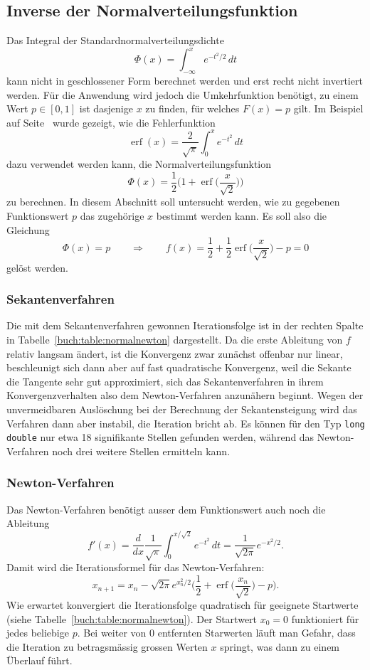 %
%
%
\subsection{Inverse der Normalverteilungsfunktion
\label{buch:subsection:inversenormal}}
Das Integral der Standardnormalverteilungsdichte
\[
\Phi(x) = \int_{-\infty}^x e^{-t^2/2}\,dt
\]
kann nicht in geschlossener Form berechnet werden und erst recht
nicht invertiert werden.
Für die Anwendung wird jedoch die Umkehrfunktion benötigt, zu einem Wert
$p\in[0,1]$ ist dasjenige $x$ zu finden, für welches $F(x)=p$ gilt.
Im Beispiel auf Seite~\pageref{buch:beispiel:erfc} wurde gezeigt,
wie die Fehlerfunktion
\[
\operatorname{erf}(x) = \frac{2}{\sqrt{\pi}}\int_0^x e^{-t^2}\,dt
\]
dazu verwendet werden kann, die Normalverteilungsfunktion
\[
\Phi(x)
=
\frac12\biggl(1+\operatorname{erf}\biggl(\frac{x}{\sqrt{2}}\biggr)\biggr)
\]
zu berechnen.
In diesem Abschnitt soll untersucht werden, wie zu gegebenen Funktionswert
$p$ das zugehörige $x$ bestimmt werden kann.
Es soll also die Gleichung
\[
\Phi(x)=p
\qquad\Rightarrow\qquad
f(x)=\frac12+\frac12\operatorname{erf}\biggl(\frac{x}{\sqrt{2}}\biggr)-p=0
\]
gelöst werden.

\subsubsection{Sekantenverfahren}
Die mit dem Sekantenverfahren gewonnen Iterationsfolge ist in der rechten
Spalte in Tabelle~\ref{buch:table:normalnewton} dargestellt.
Da die erste Ableitung von $f$ relativ langsam ändert, ist die Konvergenz
zwar zunächst offenbar nur linear, beschleunigt sich dann aber auf fast
quadratische Konvergenz, weil die Sekante die Tangente sehr gut approximiert,
sich das Sekantenverfahren in ihrem Konvergenzverhalten also dem
Newton-Verfahren anzunähern beginnt.
Wegen der unvermeidbaren Auslöschung bei der Berechnung der Sekantensteigung
wird das Verfahren dann aber instabil, die Iteration bricht ab.
Es können für den Typ \texttt{long double} nur etwa 18 signifikante
Stellen gefunden werden, während das Newton-Verfahren noch drei weitere
Stellen ermitteln kann.

\subsubsection{Newton-Verfahren}
Das Newton-Verfahren benötigt ausser dem Funktionswert auch noch die 
Ableitung
\[
f'(x)
=
\frac{d}{dx}\frac{1}{\sqrt{\pi}}\int_0^{x/\sqrt{2}} e^{-t^2}\,dt
=
\frac{1}{\sqrt{2\pi}}e^{-x^2/2}.
\]
Damit wird die Iterationsformel für das Newton-Verfahren:
\begin{equation}
x_{n+1}
=
x_n - \sqrt{2\pi} e^{x_n^2/2}
\biggl(\frac12+\operatorname{erf}\biggl(\frac{x_n}{\!\sqrt{2}}\biggr)-p\biggr).
\end{equation}
Wie erwartet konvergiert die Iterationsfolge quadratisch für geeignete
Startwerte (siehe Tabelle~\ref{buch:table:normalnewton}).
Der Startwert $x_0=0$ funktioniert für jedes beliebige $p$.
Bei weiter von $0$ entfernten Starwerten läuft man Gefahr, dass die Iteration
zu betragsmässig grossen Werten $x$ springt, was dann zu einem Überlauf führt.

